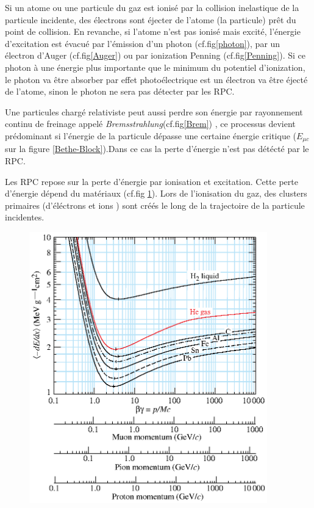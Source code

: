 Si un atome ou une particule du gaz est ionisé par la collision inelastique de la particule incidente, des électrons sont éjecter de l'atome (la particule) prêt du point de collision. En revanche, si l'atome n'est pas ionisé mais excité, l'énergie d'excitation est évacué par l'émission d'un photon (cf.fig\ref{photon}), par un électron d'Auger (cf.fig\ref{Auger}) ou par ionization Penning (cf.fig\ref{Penning}). Si ce photon à une énergie plus importante que le minimum du potentiel d'ionization, le photon va être absorber par effet photoélectrique est un électron va être éjecté de l'atome, sinon le photon ne sera pas détecter par les RPC.

Une particules chargé relativiste peut aussi perdre son énergie par rayonnement continu de freinage appelé \textit{Bremsstrahlung}(cf.fig\ref{Brem}) , ce processus devient prédominant si l'énergie de la particule dépasse une certaine énergie critique ($E_{\mu c}$ sur la figure \ref{Bethe-Block}).Dans ce cas la perte d'énergie n'est pas détécté par le RPC.

Les RPC repose sur la perte d'énergie par ionisation et excitation. Cette perte d'énergie dépend du matériaux (cf.fig \ref{mat}). Lors de l'ionisation du gaz, des clusters primaires (d'éléctrons et ions ) sont créés le long de la trajectoire de la particule incidentes. 


\begin{figure}[h!]
	\centering
	\includegraphics[width=0.92\textwidth]{RPC/energylost.eps}
	\label{mat}
\end{figure}

